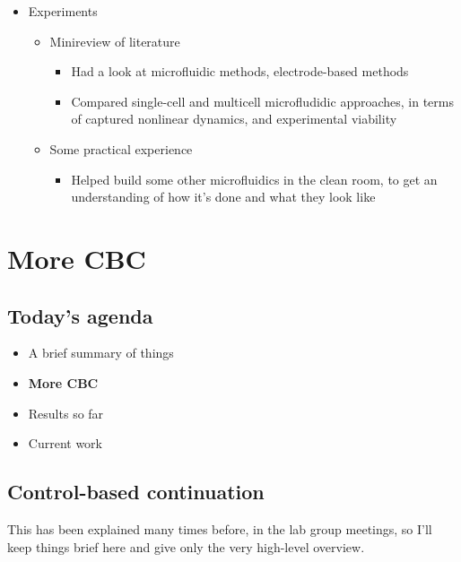 \documentclass[11pt]{article}
\begin{document}
\begin{itemize}
\item Experiments
\begin{itemize}
\item Minireview of literature
\begin{itemize}
\item Had a look at microfluidic methods, electrode-based methods
\item Compared single-cell and multicell microfludidic approaches, in terms of captured nonlinear dynamics, and experimental viability
\end{itemize}
\item Some practical experience
\begin{itemize}
\item Helped build some other microfluidics in the clean room, to get an understanding of how it's done and what they look like
\end{itemize}
\end{itemize}
\end{itemize}

\section{More CBC}
\label{sec:org007c0dd}
\subsection{Today's agenda}
\label{sec:orgc0ebdd9}
\begin{itemize}
\item A brief summary of things

\item \textbf{More CBC}

\item Results so far

\item Current work
\end{itemize}



\subsection{Control-based continuation}
\label{sec:orgbce1316}
This has been explained many times before, in the lab group meetings, so I'll keep things brief here and give only the very high-level overview.
\end{document}

